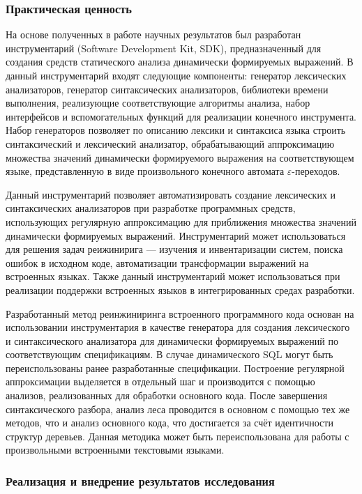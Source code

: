 \subsubsection*{\large{Практическая ценность}}

На основе полученных в работе научных результатов был разработан инструментарий (Software Development Kit, SDK), предназначенный для создания средств статического анализа динамически формируемых выражений. В данный инструментарий входят следующие компоненты: генератор лексических анализаторов, генератор синтаксических анализаторов, библиотеки времени выполнения, реализующие соответствующие алгоритмы анализа, набор интерфейсов и вспомогательных функций для реализации конечного инструмента. Набор генераторов позволяет по описанию лексики и синтаксиса языка строить синтаксический и лексический анализатор, обрабатывающий аппроксимацию множества значений динамически формируемого выражения на соответствующем языке, представленную в виде произвольного конечного автомата $\varepsilon$-переходов.

Данный инструментарий позволяет автоматизировать создание лексических и синтаксических анализаторов при разработке программных средств, использующих регулярную аппроксимацию для приближения множества значений динамически формируемых выражений. Инструментарий может использоваться  для решения задач реижинирига --- изучения и инвентаризации систем, поиска ошибок в исходном коде, автоматизации трансформации выражений на встроенных языках. Также данный инструментарий может использоваться при реализации поддержки встроенных языков в интегрированных средах разработки.

Разработанный метод реинжиниринга встроенного программного кода основан на использовании инструментария в качестве генератора для создания лексического и синтаксического анализатора для динамически 
формируемых выражений по соответствующим спецификациям. В случае динамического SQL могут быть переиспользованы ранее разработанные спецификации. Построение регулярной аппроксимации выделяется в отдельный 
шаг и производится с помощью анализов, реализованных для обработки основного кода. После завершения синтаксического разбора, анализ леса проводится в основном с помощью тех же методов, что и анализ 
основного кода, что достигается за счёт идентичности структур деревьев. Данная методика может быть переиспользована для работы с произвольными встроенными текстовыми языками.

\subsubsection*{\large{Реализация и внедрение результатов исследования}}

